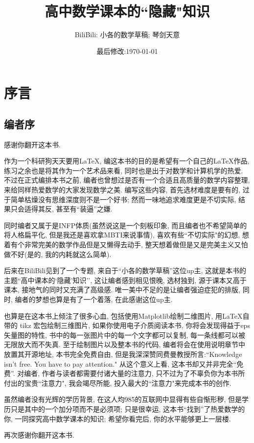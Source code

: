 \documentclass{book}
\title{高中数学课本的``隐藏"知识}
\author{BiliBili: 小各的数学草稿; 琴剑天意}
\date{最后修改:\today}
\begin{document}
    \maketitle
    \tableofcontents
    \chapter{序言}
    \section{编者序}
    感谢你翻开这本书.

    作为一个科研狗天天要用\LaTeX, 编这本书的目的是希望有一个自己的\LaTeX 作品, 练习之余也是将其作为一个艺术品来看, 同时也是出于对数学和计算机学的热爱. 不过在正式编排本书之前, 编者也曾想过是否有一个合适且高质量的数学内容整理, 来给同样热爱数学的大家发现数学之美. 编写这些内容, 首先选材难度是要有的, 过于简单枯燥没有思维深度则不是一个好书; 然而一味地追求难度更是不切实际, 结果只会适得其反, 甚至有``装逼''之嫌.

    同时编者又属于是INFP体质(虽然说这是一个刻板印象, 而且编者也不希望简单的将人格扁平化, 但是我还是喜欢拿MBTI来说事情), 喜欢有些``不切实际"的幻想, 想着有个非常完美的数学作品但是又懒得去动手, 整天想着做但是又是完美主义又怕做不好(是的, 我的内耗就这么简单).

    后来在BiliBili见到了一个专题, 来自于``小各的数学草稿''这位up主, 这就是本书的主题``高中课本的`隐藏'知识'', 这让编者感到相见恨晚, 选材独到, 源于课本又高于课本, 接地气的同时又充满了高级感. 唯一美中不足的是让编者强迫症犯的排版, 同时, 编者的梦想也算是有了一个着落, 在此感谢这位up主.

    也算是在这本书上倾注了很多心血, 包括使用Matplotlib绘制二维图片, 用\LaTeX 自带的 tikz 宏包绘制三维图片, 如果你使用电子介质阅读本书, 你将会发现得益于eps矢量图的特性, 书中的每一张图片中的每一个文字都可以复制, 每一条线都可以被无限放大而不失真. 至于绘制图片以及整本书的代码, 编者将会在使用说明章节中放置其开源地址, 本书完全免费自由, 但是我深深赞同费曼教授所言:``Knowledge isn't free. You have to pay attention." 从这个意义上看, 这本书却又并非完全“免费”. 对编者, 作者与读者都需要付诸大量的注意力, 只不过为了不辜负你为本书所付出的宝贵``注意力", 我会竭尽所能, 投入最大的``注意力"来完成本书的创作. 

    虽然编者没有光辉的学历背景, 在这人均985的互联网中显得有些自惭形秽, 但是学历只是其中的一个加分项而不是必须项; 只是很幸运, 这本书``找到''了热爱数学的你, 一同探究高中数学课本的知识; 希望你看完后, 你的水平能够更上一层楼.

    再次感谢你翻开这本书.
\end{document}
